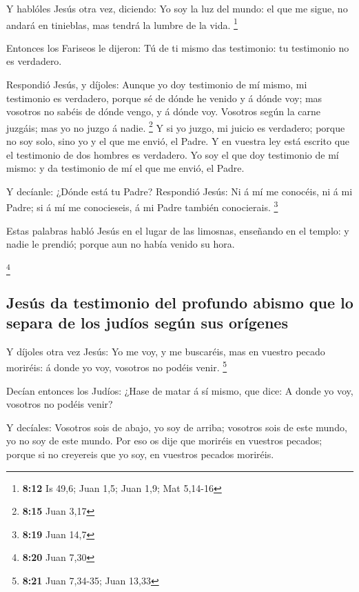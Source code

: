  Y hablóles Jesús otra vez, diciendo: Yo soy la luz del
mundo: el que me sigue, no andará en tinieblas, mas tendrá la lumbre de
la vida. \footnote{\textbf{8:12} Is 49,6; Juan 1,5; Juan 1,9; Mat
  5,14-16}

 Entonces los Fariseos le dijeron: Tú de ti mismo das
testimonio: tu testimonio no es verdadero.

 Respondió Jesús, y díjoles: Aunque yo doy testimonio de
mí mismo, mi testimonio es verdadero, porque sé de dónde he venido y á
dónde voy; mas vosotros no sabéis de dónde vengo, y á dónde voy.
 Vosotros según la carne juzgáis; mas yo no juzgo á
nadie. \footnote{\textbf{8:15} Juan 3,17}  Y si yo juzgo,
mi juicio es verdadero; porque no soy solo, sino yo y el que me envió,
el Padre.  Y en vuestra ley está escrito que el
testimonio de dos hombres es verdadero.  Yo soy el que
doy testimonio de mí mismo: y da testimonio de mí el que me envió, el
Padre.

 Y decíanle: ¿Dónde está tu Padre? Respondió Jesús: Ni á
mí me conocéis, ni á mi Padre; si á mí me conocieseis, á mi Padre
también conocierais. \footnote{\textbf{8:19} Juan 14,7}

 Estas palabras habló Jesús en el lugar de las limosnas,
enseñando en el templo: y nadie le prendió; porque aun no había venido
su hora.

\footnote{\textbf{8:20} Juan 7,30}

\hypertarget{jesuxfas-da-testimonio-del-profundo-abismo-que-lo-separa-de-los-juduxedos-seguxfan-sus-oruxedgenes}{%
\subsection{Jesús da testimonio del profundo abismo que lo separa de los
judíos según sus
orígenes}\label{jesuxfas-da-testimonio-del-profundo-abismo-que-lo-separa-de-los-juduxedos-seguxfan-sus-oruxedgenes}}

 Y díjoles otra vez Jesús: Yo me voy, y me buscaréis, mas
en vuestro pecado moriréis: á donde yo voy, vosotros no podéis venir.
\footnote{\textbf{8:21} Juan 7,34-35; Juan 13,33}

 Decían entonces los Judíos: ¿Hase de matar á sí mismo,
que dice: A donde yo voy, vosotros no podéis venir?

 Y decíales: Vosotros sois de abajo, yo soy de arriba;
vosotros sois de este mundo, yo no soy de este mundo. 
Por eso os dije que moriréis en vuestros pecados; porque si no creyereis
que yo soy, en vuestros pecados moriréis.

